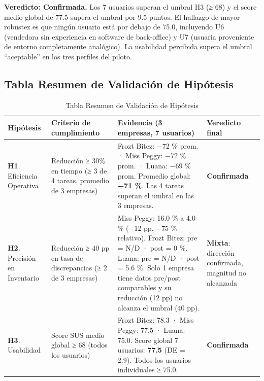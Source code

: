 \textbf{Veredicto: Confirmada.} Los 7 usuarios superan el umbral H3 (≥ 68) y el score medio global de 77.5 supera el umbral por 9.5 puntos. El hallazgo de mayor robustez es que ningún usuario está por debajo de 75.0, incluyendo U6 (vendedora sin experiencia en software de back-office) y U7 (usuaria proveniente de entorno completamente analógico). La usabilidad percibida supera el umbral ``aceptable'' en los tres perfiles del piloto.

\subsection{Tabla Resumen de Validación de Hipótesis}\label{tabla-resumen-de-validaciuxf3n-de-hipuxf3tesis}

\begin{longtable}[]{@{}
  >{\raggedright\arraybackslash}p{}
  >{\raggedright\arraybackslash}p{}
  >{\raggedright\arraybackslash}p{}
  >{\raggedright\arraybackslash}p{}@{}}
\caption[Tabla Resumen de Validación de Hipótesis]{Tabla Resumen de Validación de Hipótesis}\tabularnewline
\toprule\noalign{}
\begin{minipage}[b]{\linewidth}\raggedright
Hipótesis
\end{minipage} & \begin{minipage}[b]{\linewidth}\raggedright
Criterio de cumplimiento
\end{minipage} & \begin{minipage}[b]{\linewidth}\raggedright
Evidencia (3 empresas, 7 usuarios)
\end{minipage} & \begin{minipage}[b]{\linewidth}\raggedright
Veredicto final
\end{minipage} \\
\midrule\noalign{}
\endhead
\bottomrule\noalign{}
\endlastfoot
\textbf{H1}. Eficiencia Operativa & Reducción ≥ 30\% en tiempo (≥ 3 de 4 tareas, promedio de 3 empresas) & Frozt Bitez: −72 \% prom. · Miss Peggy: −72 \% prom. · Luana: −69 \% prom. Promedio global: \textbf{−71 \%}. Las 4 tareas superan el umbral en las 3 empresas. & \textbf{Confirmada} \\
\textbf{H2}. Precisión en Inventario & Reducción ≥ 40 pp en tasa de discrepancias (≥ 2 de 3 empresas) & Miss Peggy: 16.0 \% a 4.0 \% (−12 pp, −75 \% relativo). Frozt Bitez: pre = N/D · post = 0 \%. Luana: pre = N/D · post = 5.6 \%. Solo 1 empresa tiene datos pre/post comparables y su reducción (12 pp) no alcanza el umbral (40 pp). & \textbf{Mixta}: dirección confirmada, magnitud no alcanzada \\
\textbf{H3}. Usabilidad & Score SUS medio global ≥ 68 (todos los usuarios) & Frozt Bitez: 78.3 · Miss Peggy: 77.5 · Luana: 75.0. Score global 7 usuarios: \textbf{77.5} (DE = 2.9). Todos los usuarios individuales ≥ 75.0. & \textbf{Confirmada} \\
\end{longtable}

